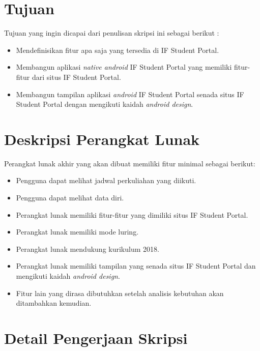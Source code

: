 \documentclass[a4paper,twoside]{article}
\begin{document}
\section{Tujuan}
Tujuan yang ingin dicapai dari penulisan skripsi ini sebagai berikut :
\begin{itemize}
    \item Mendefinisikan fitur apa saja yang tersedia di IF Student Portal.
    \item Membangun aplikasi \textit{native android} IF Student Portal yang memiliki fitur-fitur dari situs IF Student Portal.
    \item Membangun tampilan aplikasi \textit{android} IF Student Portal senada situs IF Student Portal dengan mengikuti kaidah \textit{android design}.
    
\end{itemize}

\section{Deskripsi Perangkat Lunak}

Perangkat lunak akhir yang akan dibuat memiliki fitur minimal sebagai berikut:
\begin{itemize}
	\item Pengguna dapat melihat jadwal perkuliahan yang diikuti.
	\item Pengguna dapat melihat data diri.
	\item Perangkat lunak memiliki fitur-fitur yang dimiliki situs IF Student Portal.
	\item Perangkat lunak memiliki mode luring.
	\item Perangkat lunak mendukung kurikulum 2018.
	\item Perangkat lunak memiliki tampilan yang senada situs IF Student Portal dan mengikuti kaidah \textit{android design}.
	\item Fitur lain yang dirasa dibutuhkan setelah analisis kebutuhan akan ditambahkan kemudian.
\end{itemize}

\section{Detail Pengerjaan Skripsi}
\end{document}
